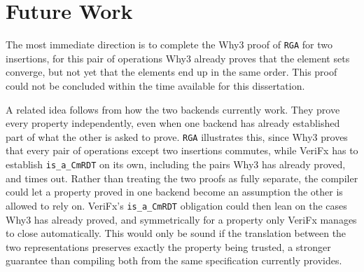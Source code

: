 \section{Future Work}
\label{sec:future-work}

The most immediate direction is to complete the Why3 proof of \texttt{RGA} for two insertions, for this pair of operations
Why3 already proves that the element sets converge, but not yet that the elements end up in the same order. This proof
could not be concluded within the time available for this dissertation.

A related idea follows from how the two backends currently work. They prove every property independently, even when one
backend has already established part of what the other is asked to prove. \texttt{RGA} illustrates this, since Why3 proves
that every pair of operations except two insertions commutes, while VeriFx has to establish \texttt{is\_a\_CmRDT} on its
own, including the pairs Why3 has already proved, and times out. Rather than treating the two proofs as fully separate,
the compiler could let a property proved in one backend become an assumption the other is allowed to rely on. VeriFx's
\texttt{is\_a\_CmRDT} obligation could then lean on the cases Why3 has already proved, and symmetrically for a property
only VeriFx manages to close automatically. This would only be sound if the translation between the two representations
preserves exactly the property being trusted, a stronger guarantee than compiling both from the same specification
currently provides.
